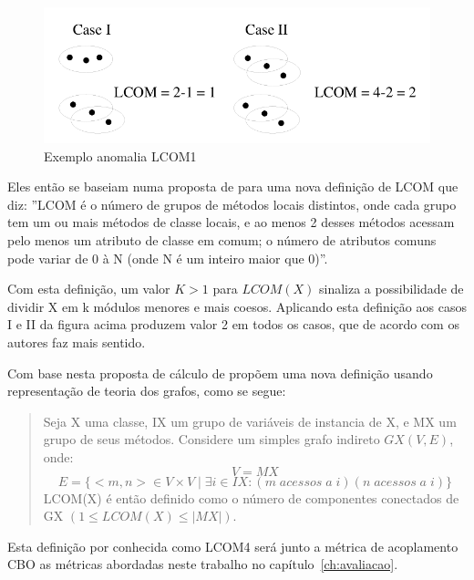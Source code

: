 \begin{figure}[h]
\center
\includegraphics[scale=0.4]{imagens/exemplo-anomalia-lcom1-hitz-e-montazeri}
\caption{Exemplo anomalia LCOM1 \cite{measuringCouplingAndCohesion}}
\label{fig:exemplo-anomalia-lcom1}
\end{figure}

Eles então se baseiam numa proposta de
 para uma nova definição de LCOM
que diz: ''LCOM é o número de grupos de métodos locais distintos, onde cada
grupo tem um ou mais métodos de classe locais, e ao menos 2 desses métodos
acessam pelo menos um atributo de classe em comum; o número de atributos comuns
pode variar de 0 à N (onde N é um inteiro maior que 0)''.

Com esta definição, um valor $K > 1$ para $LCOM(X)$ sinaliza a possibilidade de
dividir X em k módulos menores e mais coesos. Aplicando esta definição aos
casos I e II da figura acima produzem valor 2 em todos os casos, que de acordo
com os autores faz mais sentido\cite{measuringCouplingAndCohesion}.

Com base nesta proposta de cálculo de
 propõem uma nova definição usando
representação de teoria dos grafos, como se segue:

\begin{quotation}
Seja X uma classe, IX um grupo de variáveis de instancia de X, e MX um grupo
de seus métodos. Considere um simples grafo indireto $GX(V, E)$, onde: $$V =
MX$$ $$E = \{<m, n> \in V \times V \mid \exists i \in IX: (m \; acessos \; a \;
i) (n \; acessos \; a \; i)\}$$ LCOM(X) é então definido como o número de componentes
conectados de GX $(1 \leq LCOM(X) \leq |MX|)$.
\end{quotation}

Esta definição por  conhecida como
LCOM4 será junto a métrica de acoplamento CBO as métricas abordadas neste
trabalho no capítulo~\ref{ch:avaliacao}.

